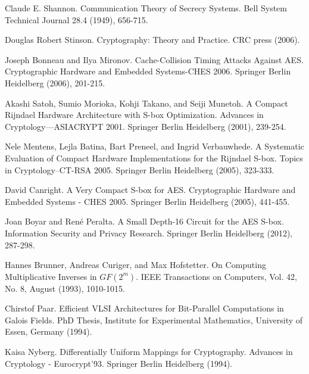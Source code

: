 \documentclass[11pt]{article}
\begin{document}

\tableofcontents

\newpage







\vspace*{2em}

\begin{thebibliography}{9}

 Claude E. Shannon. Communication Theory of Secrecy Systems. Bell System Technical Journal 28.4 (1949), 656-715.

 Douglas Robert Stinson. Cryptography: Theory and Practice. CRC press (2006).

 Joseph Bonneau and Ilya Mironov. Cache-Collision Timing Attacks Against AES. Cryptographic Hardware and Embedded Systems-CHES 2006. Springer Berlin Heidelberg (2006), 201-215.

 Akashi Satoh, Sumio Morioka, Kohji Takano, and Seiji Munetoh. A Compact Rijndael Hardware Architecture with S-box Optimization. Advances in Cryptology—ASIACRYPT 2001. Springer Berlin Heidelberg (2001), 239-254.

 Nele Mentens, Lejla Batina, Bart Preneel, and Ingrid Verbauwhede. A Systematic Evaluation of Compact Hardware Implementations for the Rijndael S-box. Topics in Cryptology–CT-RSA 2005. Springer Berlin Heidelberg (2005), 323-333.

 David Canright. A Very Compact S-box for AES. Cryptographic Hardware and Embedded Systems - CHES 2005. Springer Berlin Heidelberg (2005), 441-455.

 Joan Boyar and Ren\'{e} Peralta. A Small Depth-16 Circuit for the AES S-box. Information Security and Privacy Research. Springer Berlin Heidelberg (2012), 287-298.

 Hannes Brunner, Andreas Curiger, and Max Hofstetter. On Computing Multiplicative Inverses in $GF(2^m)$. IEEE Transactions on Computers, Vol. 42, No. 8, August (1993), 1010-1015.

 Chirstof Paar. Efficient VLSI Architectures for Bit-Parallel Computations in Galois Fields. PhD Thesis, Institute for Experimental Mathematics, University of Essen, Germany (1994).

 Kaisa Nyberg. Differentially Uniform Mappings for Cryptography. Advances in Cryptology - Eurocrypt’93. Springer Berlin Heidelberg (1994).


\end{thebibliography}
\end{document}
